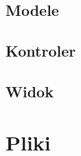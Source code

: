 \documentclass[10pt,a4paper]{article}
\begin{document}
\subsection{Modele}

\subsection{Kontroler}

\subsection{Widok}

\section{Pliki}
\end{document}
